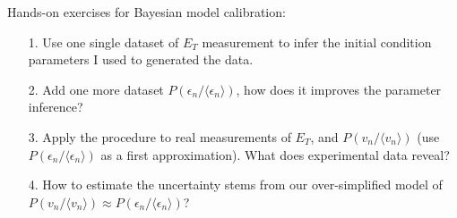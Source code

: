 \documentclass[11pt, aspectratio=169]{beamer}
\begin{document}
\begin{frame}{Hands-on exercises for Bayesian model calibration:}
\begin{itemize}
\item[1.] Use one single dataset of $E_T$ measurement to infer the initial condition parameters I used to generated the data.
\item[2.] Add one more dataset $P(\epsilon_n/\langle \epsilon_n\rangle)$, how does it improves the parameter inference?
\item[3.] Apply the procedure to real measurements of $E_T$, and $P(v_n/\langle v_n\rangle)$ (use $P(\epsilon_n/\langle \epsilon_n\rangle)$ as a first approximation). What does experimental data reveal?
\item[4.] How to estimate the uncertainty stems from our over-simplified model of $P(v_n/\langle v_n\rangle)\approx P(\epsilon_n/\langle \epsilon_n\rangle)$?
\end{itemize}
\end{frame}
\end{document}
